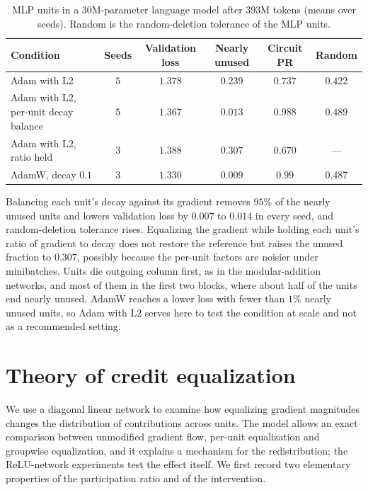 \documentclass{article} %
\begin{document}
\begin{table}[!ht]
\caption{MLP units in a $30$M-parameter language model after $393$M tokens (means over seeds). Random is the random-deletion tolerance of the MLP units.}
\label{tab:lm}
\begin{center}
\footnotesize
\setlength{\tabcolsep}{4pt}
\begin{tabular}{lccccc}
\toprule
Condition & Seeds & Validation loss & Nearly unused & Circuit PR & Random \\
\midrule
Adam with L2 & $5$ & $1.378$ & $0.239$ & $0.737$ & $0.422$ \\
Adam with L2, per-unit decay balance & $5$ & $1.367$ & $0.013$ & $0.988$ & $0.489$ \\
Adam with L2, ratio held & $3$ & $1.388$ & $0.307$ & $0.670$ & --- \\
AdamW, decay $0.1$ & $3$ & $1.330$ & $0.009$ & $0.99$ & $0.487$ \\
\bottomrule
\end{tabular}
\end{center}
\end{table}

Balancing each unit's decay against its gradient removes $95\%$ of the nearly unused units and lowers validation loss by $0.007$ to $0.014$ in every seed, and random-deletion tolerance rises. Equalizing the gradient while holding each unit's ratio of gradient to decay does not restore the reference but raises the unused fraction to $0.307$, possibly because the per-unit factors are noisier under minibatches. Units die outgoing column first, as in the modular-addition networks, and most of them in the first two blocks, where about half of the units end nearly unused. AdamW reaches a lower loss with fewer than $1\%$ nearly unused units, so Adam with L2 serves here to test the condition at scale and not as a recommended setting.

\section{Theory of credit equalization}
\label{app:theory}
We use a diagonal linear network to examine how equalizing gradient magnitudes changes the distribution of contributions across units. The model allows an exact comparison between unmodified gradient flow, per-unit equalization and groupwise equalization, and it explains a mechanism for the redistribution; the ReLU-network experiments test the effect itself. We first record two elementary properties of the participation ratio and of the intervention.
\end{document}
